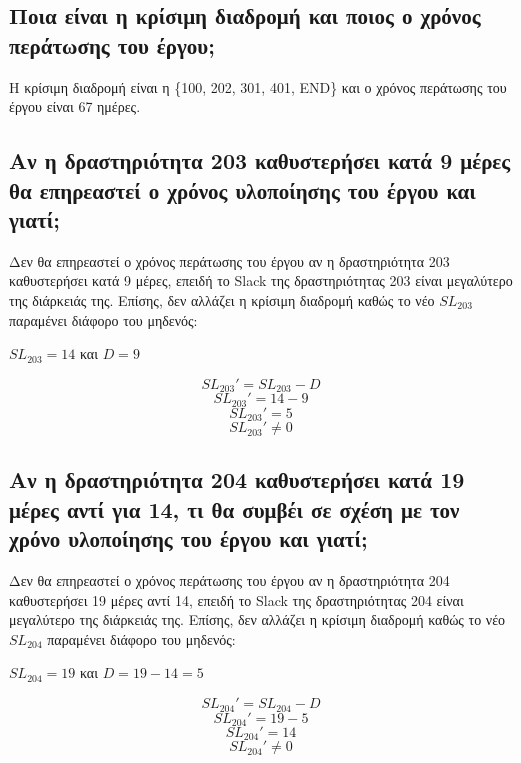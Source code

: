 \documentclass[12pt]{turabian-researchpaper}
\begin{document}
\subsection{Ποια είναι η κρίσιμη διαδρομή και ποιος ο χρόνος περάτωσης του έργου;}
\begin{figure}
    \centering
    \def\svgwidth{\columnwidth}
    
\end{figure}
Η κρίσιμη διαδρομή είναι η \{100, 202, 301, 401, END\} και ο χρόνος περάτωσης του έργου είναι 67 ημέρες.

\subsection{Αν η δραστηριότητα 203 καθυστερήσει κατά 9 μέρες θα επηρεαστεί ο χρόνος υλοποίησης του έργου και γιατί;}
Δεν θα επηρεαστεί ο χρόνος περάτωσης του έργου αν η δραστηριότητα 203 καθυστερήσει κατά 9 μέρες, επειδή το Slack της δραστηριότητας 203 είναι μεγαλύτερο της διάρκειάς της. Επίσης, δεν αλλάζει η κρίσιμη διαδρομή καθώς το νέο $SL_{203}$ παραμένει διάφορο του μηδενός:
\begin{center}
    $ SL_{203} = 14 $ και $ D = 9 $
\end{center}
$$ SL_{203}' = SL_{203} - D $$
$$ SL_{203}' = 14 - 9 $$
$$ SL_{203}' = 5 $$
$$ SL_{203}' \neq 0 $$

\subsection{Αν η δραστηριότητα 204 καθυστερήσει κατά 19 μέρες αντί για 14, τι θα συμβέι σε σχέση με τον χρόνο υλοποίησης του έργου και γιατί;}
Δεν θα επηρεαστεί ο χρόνος περάτωσης του έργου αν η δραστηριότητα 204 καθυστερήσει 19 μέρες αντί 14, επειδή το Slack της δραστηριότητας 204 είναι μεγαλύτερο της διάρκειάς της. Επίσης, δεν αλλάζει η κρίσιμη διαδρομή καθώς το νέο $SL_{204}$ παραμένει διάφορο του μηδενός:
\begin{center}
    $ SL_{204} = 19 $ και $ D = 19 - 14 = 5 $
\end{center}
$$ SL_{204}' = SL_{204} - D $$
$$ SL_{204}' = 19 - 5 $$
$$ SL_{204}' = 14 $$
$$ SL_{204}' \neq 0 $$
\end{document}
